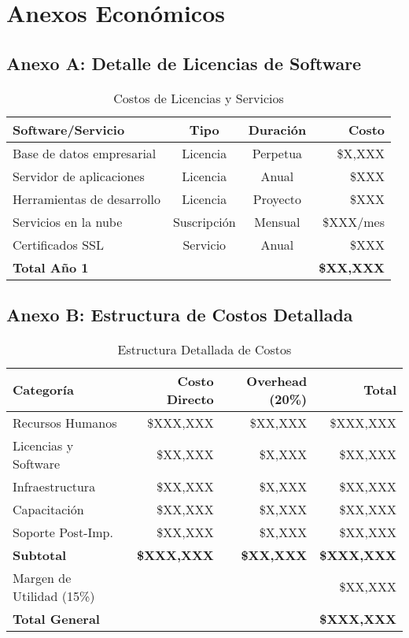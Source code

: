 \section{Anexos Económicos}

\subsection{Anexo A: Detalle de Licencias de Software}
\begin{table}[h!]
\centering
\begin{tabular}{|l|c|c|r|}
\hline
\textbf{Software/Servicio} & \textbf{Tipo} & \textbf{Duración} & \textbf{Costo} \\
\hline
Base de datos empresarial & Licencia & Perpetua & \$X,XXX \\
Servidor de aplicaciones & Licencia & Anual & \$XXX \\
Herramientas de desarrollo & Licencia & Proyecto & \$XXX \\
Servicios en la nube & Suscripción & Mensual & \$XXX/mes \\
Certificados SSL & Servicio & Anual & \$XXX \\
\hline
\textbf{Total Año 1} & & & \textbf{\$XX,XXX} \\
\hline
\end{tabular}
\caption{Costos de Licencias y Servicios}
\end{table}

\subsection{Anexo B: Estructura de Costos Detallada}
\begin{table}[h!]
\centering
\begin{tabular}{|l|r|r|r|}
\hline
\textbf{Categoría} & \textbf{Costo Directo} & \textbf{Overhead (20\%)} & \textbf{Total} \\
\hline
Recursos Humanos & \$XXX,XXX & \$XX,XXX & \$XXX,XXX \\
Licencias y Software & \$XX,XXX & \$X,XXX & \$XX,XXX \\
Infraestructura & \$XX,XXX & \$X,XXX & \$XX,XXX \\
Capacitación & \$XX,XXX & \$X,XXX & \$XX,XXX \\
Soporte Post-Imp. & \$XX,XXX & \$X,XXX & \$XX,XXX \\
\hline
\textbf{Subtotal} & \textbf{\$XXX,XXX} & \textbf{\$XX,XXX} & \textbf{\$XXX,XXX} \\
Margen de Utilidad (15\%) & & & \$XX,XXX \\
\hline
\textbf{Total General} & & & \textbf{\$XXX,XXX} \\
\hline
\end{tabular}
\caption{Estructura Detallada de Costos}
\end{table}

